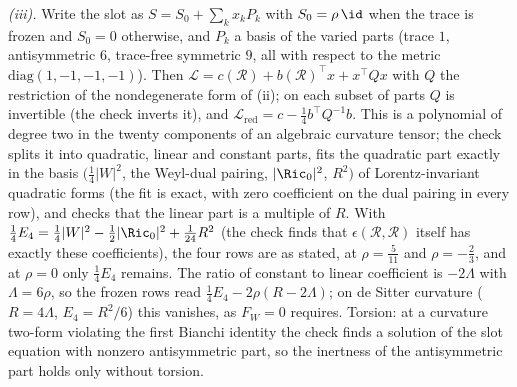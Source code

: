 \emph{(iii).} Write the slot as $S = S_{0} + \sum_{k} x_{k}P_{k}$ with $S_{0} = \rho\,\id$ when the trace is frozen and $S_{0} = 0$ otherwise, and $P_{k}$ a basis of the varied parts (trace $1$, antisymmetric $6$, trace-free symmetric $9$, all with respect to the metric $\mathrm{diag}(1,-1,-1,-1)$). Then $\mathcal{L} = c(\mathcal{R}) + b(\mathcal{R})^{\top}x + x^{\top}Qx$ with $Q$ the restriction of the nondegenerate form of (ii); on each subset of parts $Q$ is invertible (the check inverts it), and $\mathcal{L}_{\mathrm{red}} = c - \tfrac14 b^{\top}Q^{-1}b$. This is a polynomial of degree two in the twenty components of an algebraic curvature tensor; the check splits it into quadratic, linear and constant parts, fits the quadratic part exactly in the basis $(\tfrac14|W|^{2}$, the Weyl-dual pairing, $|\Ric_{0}|^{2}$, $R^{2})$ of Lorentz-invariant quadratic forms (the fit is exact, with zero coefficient on the dual pairing in every row), and checks that the linear part is a multiple of $R$. With $\tfrac14 E_{4} = \tfrac14|W|^{2} - \tfrac12|\Ric_{0}|^{2} + \tfrac{1}{24}R^{2}$ (the check finds that $\epsilon(\mathcal{R}, \mathcal{R})$ itself has exactly these coefficients), the four rows are as stated, at $\rho = \tfrac{5}{11}$ and $\rho = -\tfrac23$, and at $\rho = 0$ only $\tfrac14 E_{4}$ remains. The ratio of constant to linear coefficient is $-2\Lambda$ with $\Lambda = 6\rho$, so the frozen rows read $\tfrac14 E_{4} - 2\rho(R - 2\Lambda)$; on de Sitter curvature ($R = 4\Lambda$, $E_{4} = R^{2}/6$) this vanishes, as $F_{W} = 0$ requires. Torsion: at a curvature two-form violating the first Bianchi identity the check finds a solution of the slot equation with nonzero antisymmetric part, so the inertness of the antisymmetric part holds only without torsion.

